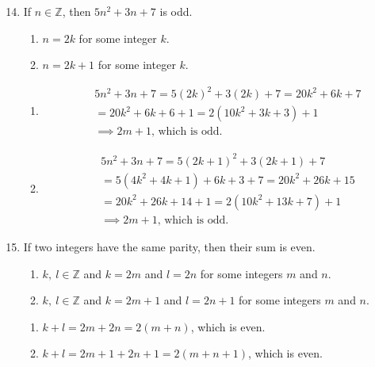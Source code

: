 \documentclass{article}
\begin{document}
\begin{enumerate}[label=\#\arabic*]
    \setcounter{enumi}{13}
    \item If $n \in \mathbb{Z}$, then $5n^2+3n+7$ is odd.
    \begin{enumerate}[label=Case \arabic*:]
        \item $n = 2k$ for some integer $k$.
        \item $n = 2k + 1$ for some integer $k$.
    \end{enumerate}
    \begin{enumerate}[label=Proof \arabic*:]
        \item
        \[
            \begin{aligned}
                &5n^2 + 3n + 7 = 5(2k)^2 + 3(2k) + 7 = 20k^2 + 6k + 7 \\
                &= 20k^2 + 6k + 6 + 1 = 2(10k^2 + 3k + 3) + 1\\
                &\implies 2m + 1 \text{, which is odd.}
            \end{aligned}
        \]
        \item 
        \[
            \begin{aligned}
                &5n^2 + 3n + 7 = 5(2k + 1)^2 + 3(2k + 1) + 7 \\
                &= 5(4k^2 + 4k + 1) + 6k + 3 + 7 = 20k^2 + 26k + 15 \\
                &= 20k^2 + 26k + 14 + 1 = 2(10k^2 + 13k + 7) + 1\\
                &\implies 2m + 1 \text{, which is odd.}
            \end{aligned}
        \]
    \end{enumerate}

    \setcounter{enumi}{15}
    \item  If two integers have the same parity, then their sum is even.
    \begin{enumerate}[label=Case \arabic*:]
        \item $k, \ l \in \mathbb{Z}$ and $k = 2m$ and $l = 2n$ for some integers $m$ and $n$.
        \item $k, \ l \in \mathbb{Z}$ and $k = 2m + 1$ and $l = 2n + 1$ for some integers $m$ and $n$.
    \end{enumerate}
    \begin{enumerate}[label=Proof \arabic*:]
        \item $k + l = 2m + 2n = 2(m + n)$, which is even.
        \item $k + l = 2m + 1 + 2n + 1 = 2(m + n + 1)$, which is even.
    \end{enumerate}
\end{enumerate}
\end{document}
